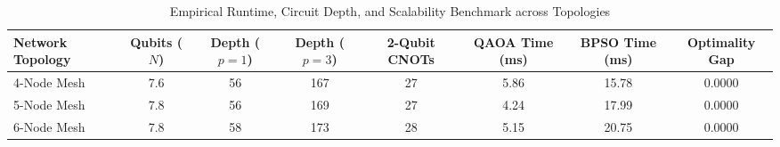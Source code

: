 \begin{table}[h!]
\centering
\caption{Empirical Runtime, Circuit Depth, and Scalability Benchmark across Topologies}
\label{tab:runtime_scalability}
\begin{tabular}{l c c c c c c c}
\hline\hline
Network Topology & Qubits ($N$) & Depth ($p=1$) & Depth ($p=3$) & 2-Qubit CNOTs & QAOA Time (ms) & BPSO Time (ms) & Optimality Gap \\
\hline
4-Node Mesh      & 7.6 & 56 & 167 & 27 & 5.86 & 15.78 & 0.0000 \\
5-Node Mesh      & 7.8 & 56 & 169 & 27 & 4.24 & 17.99 & 0.0000 \\
6-Node Mesh      & 7.8 & 58 & 173 & 28 & 5.15 & 20.75 & 0.0000 \\
\hline\hline
\end{tabular}
\end{table}
